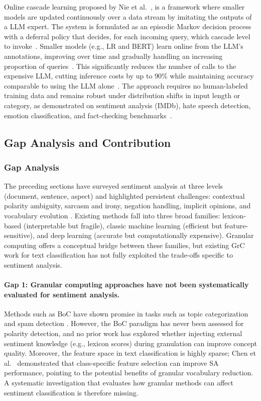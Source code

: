 \documentclass[a4paper,twoside,12pt]{book}
\newcommand{\logreg}{LR}
\begin{document}
Online cascade learning proposed by Nie et al.~\cite{nie2024online}, is a framework where smaller models are updated continuously over a data stream by imitating the outputs of a LLM expert. The system is formulated as an episodic Markov decision process with a deferral policy that decides, for each incoming query, which cascade level to invoke~\cite{nie2024online}. Smaller models (e.g., \logreg{} and BERT) learn online from the LLM's annotations, improving over time and gradually handling an increasing proportion of queries~\cite{nie2024online}. This significantly reduces the number of calls to the expensive LLM, cutting inference costs by up to 90\% while maintaining accuracy comparable to using the LLM alone~\cite{nie2024online}. The approach requires no human-labeled training data and remains robust under distribution shifts in input length or category, as demonstrated on sentiment analysis (IMDb), hate speech detection, emotion classification, and fact-checking benchmarks~\cite{nie2024online}.

\subsection{Gap Analysis and Contribution}
\subsubsection{Gap Analysis}

The preceding sections have surveyed sentiment analysis at three levels (document, sentence, aspect) and highlighted persistent challenges: contextual polarity ambiguity, sarcasm and irony, negation handling, implicit opinions, and vocabulary evolution \cite{behdenna2018document, sharma2025review}. Existing methods fall into three broad families: lexicon-based (interpretable but fragile), classic machine learning (efficient but feature-sensitive), and deep learning (accurate but computationally expensive). Granular computing offers a conceptual bridge between these families, but existing GrC work for text classification has not fully exploited the trade-offs specific to sentiment analysis.

\paragraph{Gap 1: Granular computing approaches have not been systematically evaluated for sentiment analysis.}

Methods such as BoC have shown promise in tasks such as topic categorization and spam detection \cite{Capillo2020mining, Possemato2013AutomaticTC}. However, the BoC paradigm has never been assessed for polarity detection, and no prior work has explored whether injecting external sentiment knowledge (e.g., lexicon scores) during granulation can improve concept quality. Moreover, the feature space in text classification is highly sparse; Chen et al.~\cite{Chen2022threeway} demonstrated that class-specific feature selection can improve SA performance, pointing to the potential benefits of granular vocabulary reduction. A systematic investigation that evaluates how granular methods can affect sentiment classification is therefore missing.
\end{document}
